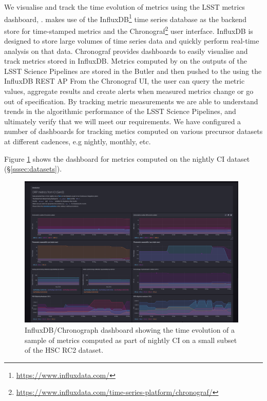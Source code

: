 We visualise and track the time evolution of \faro metrics using the LSST metrics dashboard, \squash\cite{SQR-009}. 
\squash makes use of the InfluxDB\footnote{\url{https://www.influxdata.com/}} time series database as the backend store for time-stamped metrics and the Chronograf\footnote{\url{https://www.influxdata.com/time-series-platform/chronograf/}} user interface.
InfluxDB is designed to store large volumes of time series data and quickly perform real-time analysis on that data.
Chronograf provides dashboards to easily visualise and track metrics stored in InfluxDB. 
Metrics computed by \faro on the outputs of the LSST Science Pipelines are stored in the Butler and then pushed to the \squash using  the InfluxDB REST AP
From the Chronograf UI, the user can query the metric values, aggregate results and create alerts when measured metrics change or go out of specification. 
By tracking metric measurements we are able to understand trends in the algorithmic performance of the LSST Science Pipelines, and ultimately verify that we will meet our requirements.
We have configured a number of dashboards for tracking \faro metics computed on various precursor datasets at different cadences, e.g nightly, monthly, etc. 

Figure \ref{fig:squash_metrics_ci} shows the dashboard for \faro metrics computed on the nightly CI dataset (\S \ref{sssec:datasets}). 
\begin{figure}[h]

  \par\medskip 
  \includegraphics[width=0.98\textwidth]{figures/squash-dashboard-ci.png}
  \par\medskip   
  \caption{InfluxDB/Chronograph dashboard showing the time evolution of a sample of metrics computed as part of nightly CI on a small subset of the HSC RC2 dataset.}
  \label{fig:squash_metrics_ci}
\end{figure}



